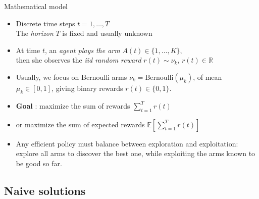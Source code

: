 \documentclass[11pt,english,ignorenonframetext,]{beamer}
\begin{document}
\begin{frame}{Mathematical model}

\begin{itemize}
  \item
  Discrete time steps $t = 1, \dots, T$\\
  The \emph{horizon} $T$ is fixed and usually unknown

  \item
  At time $t$, an \emph{agent plays the arm} $A(t)\in\{1,\dots,K\}$,\\
  then she observes the \emph{iid random reward} $r(t) \sim \nu_k$, $r(t)\in\mathbb{R}$

  \pause
  \item
  Usually, we focus on Bernoulli arms $\nu_k = \mathrm{Bernoulli}(\mu_k)$, of mean $\mu_k\in[0,1]$,
  giving binary rewards $r(t) \in\{0,1\}$.

  \pause
  \item
  \textbf{Goal} : maximize the sum of rewards $\sum\limits_{t=1}^T r(t)$

  \item
  or \alert{maximize the sum of expected rewards $\mathbb{E}\left[ \sum\limits_{t=1}^T r(t) \right]$}

  \pause
  \item
  Any efficient policy must balance \alert{between exploration and exploitation}:
  explore all arms to discover the best one,
  while exploiting the arms known to be good so far.
\end{itemize}

\end{frame}


\subsection{\hfill{}Naive solutions\hfill{}}
\end{document}
